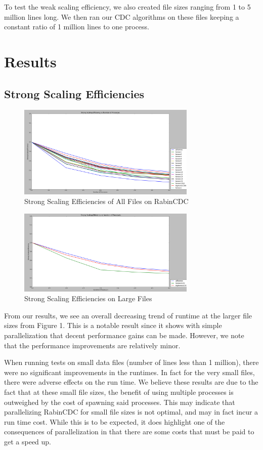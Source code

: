 \documentclass{acmtog} %
\begin{document}
	To test the weak scaling efficiency, we also created file sizes ranging from 1 to 5 million lines long. We then ran our CDC algorithms on these files keeping a constant ratio of 1 million lines to one process. \\ 
	
	\section{Results}
	\subsection{Strong Scaling Efficiencies}

	
	\begin{figure}
				\centerline{\includegraphics[width=8.5cm]{img/StrongScalingAllFiles}}
				\caption{Strong Scaling Efficiencies of All Files on RabinCDC}
				\label{fig:strongscale}
	\end{figure}
		\begin{figure}
			\centerline{\includegraphics[width=8.5cm]{img/StrongScalingLargeFile}}
			\caption{Strong Scaling Efficiencies on Large Files}
			\label{fig:strongscalelarge}
		\end{figure}
	From our results, we see an overall decreasing trend of runtime at the larger file sizes from Figure 1. This is a notable result since it shows with simple parallelization that decent performance gains can be made. However, we note that the performance improvements are relatively minor.
	
	When running tests on small data files (number of lines less than 1 million), there were no significant improvements in the runtimes. In fact for the very small files, there were adverse effects on the run time. We believe these results are due to the fact that at these small file sizes, the benefit of using multiple processes is outweighed by the cost of spawning said processes. This may indicate that parallelizing RabinCDC for small file sizes is not optimal, and may in fact incur a run time cost. While this is to be expected, it does highlight one of the consequences of parallelization in that there are some costs that must be paid to get a speed up.\\
	
\end{document}
